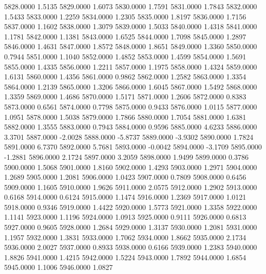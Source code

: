 5828.0000      1.5135
5829.0000      1.6073
5830.0000      1.7591
5831.0000      1.7843
5832.0000      1.5433
5833.0000      1.2259
5834.0000      1.2305
5835.0000      1.8197
5836.0000      1.7156
5837.0000      1.1602
5838.0000      1.3079
5839.0000      1.5033
5840.0000      1.4318
5841.0000      1.1781
5842.0000      1.1381
5843.0000      1.6525
5844.0000      1.7098
5845.0000      1.2897
5846.0000      1.4631
5847.0000      1.8572
5848.0000      1.8651
5849.0000      1.3360
5850.0000      0.7944
5851.0000      1.1040
5852.0000      1.4852
5853.0000      1.4599
5854.0000      1.5691
5855.0000      1.4335
5856.0000      1.2211
5857.0000      1.1975
5858.0000      1.4324
5859.0000      1.6131
5860.0000      1.4356
5861.0000      0.9862
5862.0000      1.2582
5863.0000      1.3354
5864.0000      1.2139
5865.0000      1.3206
5866.0000      1.6045
5867.0000      1.5492
5868.0000      1.3359
5869.0000      1.4686
5870.0000      1.5171
5871.0000      1.2606
5872.0000      0.8383
5873.0000      0.6561
5874.0000      0.7798
5875.0000      0.9433
5876.0000      1.0115
5877.0000      1.0951
5878.0000      1.5038
5879.0000      1.7866
5880.0000      1.7054
5881.0000      1.6381
5882.0000      1.3555
5883.0000      0.7943
5884.0000      0.9596
5885.0000      4.6233
5886.0000      3.3701
5887.0000     -2.0028
5888.0000     -5.8737
5889.0000     -3.9302
5890.0000      1.7824
5891.0000      6.7370
5892.0000      5.7681
5893.0000     -0.0042
5894.0000     -3.1709
5895.0000     -1.2881
5896.0000      2.1724
5897.0000      3.2059
5898.0000      1.9499
5899.0000      0.3786
5900.0000      1.5068
5901.0000      1.8160
5902.0000      1.4293
5903.0000      1.2971
5904.0000      1.2689
5905.0000      1.2081
5906.0000      1.0423
5907.0000      0.7809
5908.0000      0.6456
5909.0000      1.1605
5910.0000      1.9626
5911.0000      2.0575
5912.0000      1.2902
5913.0000      0.6168
5914.0000      0.6124
5915.0000      1.1474
5916.0000      1.2369
5917.0000      1.0121
5918.0000      0.9346
5919.0000      1.4422
5920.0000      1.5773
5921.0000      1.3358
5922.0000      1.1141
5923.0000      1.1196
5924.0000      1.0913
5925.0000      0.9111
5926.0000      0.6813
5927.0000      0.9605
5928.0000      1.2684
5929.0000      1.3137
5930.0000      1.2081
5931.0000      1.1957
5932.0000      1.3831
5933.0000      1.7062
5934.0000      1.8662
5935.0000      2.1734
5936.0000      2.0027
5937.0000      0.8933
5938.0000      0.6166
5939.0000      1.2383
5940.0000      1.8826
5941.0000      1.4215
5942.0000      1.5224
5943.0000      1.7892
5944.0000      1.6854
5945.0000      1.1006
5946.0000      1.0827
